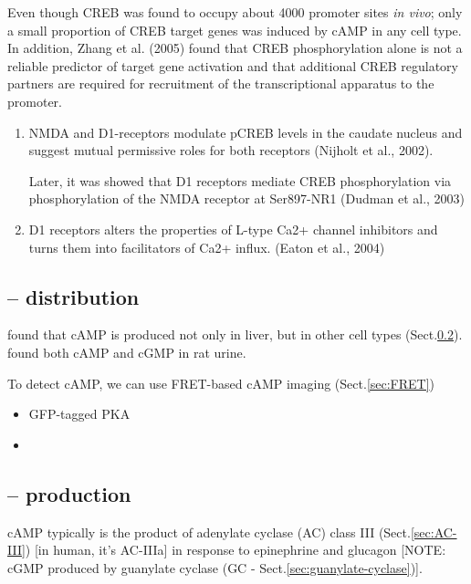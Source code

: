 Even though CREB was found to occupy about 4000 promoter sites {\it in
vivo}; only a small proportion of CREB target genes was induced by cAMP in any
cell type. In addition, Zhang et al. (2005) found that CREB phosphorylation
alone is not a reliable predictor of target gene activation and that additional
CREB regulatory partners are required for recruitment of the transcriptional
apparatus to the promoter.

\begin{enumerate}
  \item NMDA and D1-receptors modulate pCREB levels in the caudate nucleus
  and suggest mutual permissive roles for both receptors (Nijholt et al., 2002).
  

Later, it was showed that D1 receptors mediate CREB phosphorylation via
phosphorylation of the NMDA receptor at Ser897-NR1 (Dudman et al., 2003)

  \item  D1 receptors alters the properties of L-type Ca2+ channel inhibitors
  and turns them into facilitators of Ca2+ influx. (Eaton et al., 2004)
  
\end{enumerate}

\subsection{-- distribution}
\label{sec:cAMP-concentration}

\citep{Rall1958} found that cAMP is produced not only in liver, but in other
cell types (Sect.\ref{sec:cAMP-production}). \citep{Ashmana1963} found both cAMP
and cGMP in rat urine.

To detect cAMP, we can use FRET-based cAMP imaging (Sect.\ref{sec:FRET})
\begin{itemize}
  \item GFP-tagged PKA 
  
  \item 
\end{itemize}

\subsection{-- production}
\label{sec:cAMP-production}

cAMP typically is the product of adenylate cyclase (AC) class III
(Sect.\ref{sec:AC-III}) [in  human, it's AC-IIIa] in response to epinephrine and
glucagon [NOTE: cGMP produced by guanylate cyclase (GC -
Sect.\ref{sec:guanylate-cyclase})].

